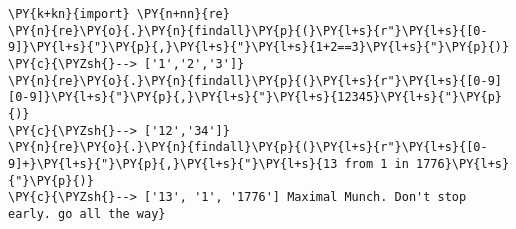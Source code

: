 \begin{Verbatim}[commandchars=\\\{\}]
\PY{k+kn}{import} \PY{n+nn}{re}
\PY{n}{re}\PY{o}{.}\PY{n}{findall}\PY{p}{(}\PY{l+s}{r"}\PY{l+s}{[0-9]}\PY{l+s}{"}\PY{p}{,}\PY{l+s}{"}\PY{l+s}{1+2==3}\PY{l+s}{"}\PY{p}{)}
\PY{c}{\PYZsh{}--> ['1','2','3']}
\PY{n}{re}\PY{o}{.}\PY{n}{findall}\PY{p}{(}\PY{l+s}{r"}\PY{l+s}{[0-9][0-9]}\PY{l+s}{"}\PY{p}{,}\PY{l+s}{"}\PY{l+s}{12345}\PY{l+s}{"}\PY{p}{)}
\PY{c}{\PYZsh{}--> ['12','34']}
\PY{n}{re}\PY{o}{.}\PY{n}{findall}\PY{p}{(}\PY{l+s}{r"}\PY{l+s}{[0-9]+}\PY{l+s}{"}\PY{p}{,}\PY{l+s}{"}\PY{l+s}{13 from 1 in 1776}\PY{l+s}{"}\PY{p}{)}
\PY{c}{\PYZsh{}--> ['13', '1', '1776'] Maximal Munch. Don't stop early. go all the way}
\end{Verbatim}
